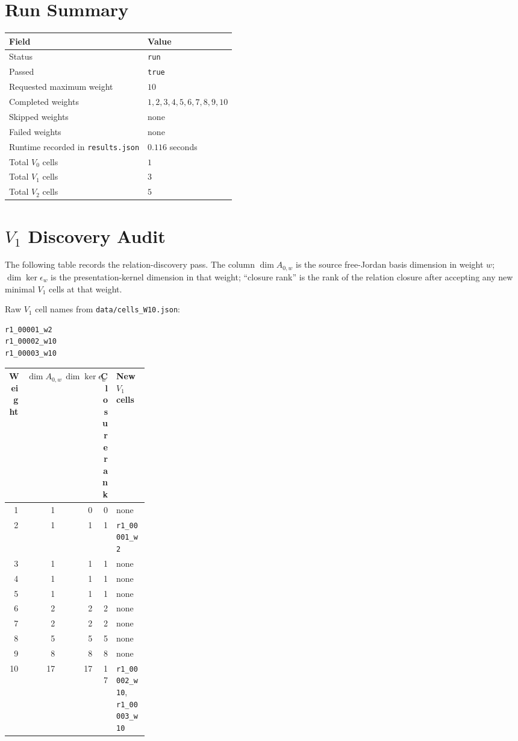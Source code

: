 \documentclass[11pt]{article}
\begin{document}
\section*{Run Summary}

\begin{center}
\begin{tabular}{ll}
\toprule
Field & Value \\
\midrule
Status & \texttt{run} \\
Passed & \texttt{true} \\
Requested maximum weight & \(10\) \\
Completed weights & \(1,2,3,4,5,6,7,8,9,10\) \\
Skipped weights & none \\
Failed weights & none \\
Runtime recorded in \texttt{results.json} & \(0.116\) seconds \\
Total \(V_0\) cells & \(1\) \\
Total \(V_1\) cells & \(3\) \\
Total \(V_2\) cells & \(5\) \\
\bottomrule
\end{tabular}
\end{center}

\section*{\(V_1\) Discovery Audit}

The following table records the relation-discovery pass.  The column
\(\dim A_{0,w}\) is the source free-Jordan basis dimension in weight \(w\);
\(\dim\ker\epsilon_w\) is the presentation-kernel dimension in that weight;
``closure rank'' is the rank of the relation closure after accepting any new
minimal \(V_1\) cells at that weight.

Raw \(V_1\) cell names from \texttt{data/cells\_W10.json}:
\begin{lstlisting}
r1_00001_w2
r1_00002_w10
r1_00003_w10
\end{lstlisting}

\begin{center}
\begin{tabular}{rrrrL{0.27\linewidth}}
\toprule
Weight & \(\dim A_{0,w}\) & \(\dim\ker\epsilon_w\) & Closure rank & New \(V_1\) cells \\
 & 1 & 0 & 0 & none \\
2 & 1 & 1 & 1 & \texttt{r1\_00001\_w2} \\
3 & 1 & 1 & 1 & none \\
4 & 1 & 1 & 1 & none \\
5 & 1 & 1 & 1 & none \\
6 & 2 & 2 & 2 & none \\
7 & 2 & 2 & 2 & none \\
8 & 5 & 5 & 5 & none \\
9 & 8 & 8 & 8 & none \\
10 & 17 & 17 & 17 & \texttt{r1\_00002\_w10}, \texttt{r1\_00003\_w10} \\
\bottomrule
\end{tabular}
\end{center}
\end{document}
